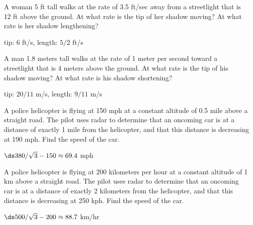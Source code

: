 \begin{enumialphparenastyle}

\begin{ex} 
A woman 5 ft tall walks at the rate of 3.5 ft/sec away from a streetlight
that is 12 ft above the ground.  At what rate is the tip of her shadow
moving?  At what rate is her shadow lengthening?
\begin{sol}
	tip: 6 ft/s, length: $5/2$ ft/s
\end{sol}
\end{ex}

\begin{ex} 
A man 1.8 meters tall walks at the rate of 1 meter per
second toward a streetlight that is 4 meters above the ground.  At
what rate is the tip of his shadow moving?  At what rate is his shadow
shortening?
\begin{sol}
	tip: $20/11$ m/s, length: $9/11$ m/s
\end{sol}
\end{ex}

\begin{ex} 
A police helicopter is flying at 150 mph at a constant altitude of 0.5 mile
above a straight road.  The pilot uses radar to determine that an oncoming
car is at a distance of exactly 1 mile from the helicopter, and that this
distance is decreasing at 190 mph.  Find the speed of the car.
\begin{sol}
	$\ds 380/\sqrt3-150\approx 69.4$ mph
\end{sol}
\end{ex}

\begin{ex} 
A police helicopter is flying at 200 kilometers per hour at
a constant altitude of 1 km above a straight road.  The pilot uses
radar to determine that an oncoming car is at a distance of exactly 2
kilometers from the helicopter, and that this distance is decreasing at 250
kph.  Find the speed of the car.
\begin{sol}
	$\ds 500/\sqrt3-200\approx 88.7$ km/hr
\end{sol}
\end{ex}


\end{enumialphparenastyle}
